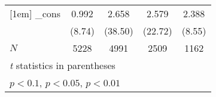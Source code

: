{\begin{tabular}{l*{4}{c}}
[1em]
\_cons      &       0.992\sym{***}&       2.658\sym{***}&       2.579\sym{***}&       2.388\sym{***}\\
            &      (8.74)         &     (38.50)         &     (22.72)         &      (8.55)         \\
\hline
\(N\)       &        5228         &        4991         &        2509         &        1162         \\
\hline\hline
\multicolumn{5}{l}{\footnotesize \textit{t} statistics in parentheses}\\
\multicolumn{5}{l}{\footnotesize \sym{*} \(p<0.1\), \sym{**} \(p<0.05\), \sym{***} \(p<0.01\)}\\
\end{tabular}
}
